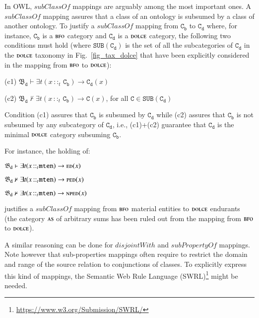 \documentclass[ao]{iosart2x}
\newcommand{\nb}[1]{\textcolor{red}{$|$}\marginpar{\hspace*{-0cm}\parbox{20mm}{\scriptsize\raggedright\textcolor{red}{#1}}}}
\newcommand{\bflist}{\begin{list}{}{\setlength{\topsep}{2mm}\setlength{\parsep}{0mm}\setlength{\leftmargin}{9.2mm}\setlength{\labelwidth}{8mm}}}
\newcommand{\eflist}{\end{list}}
\newcommand{\pr}[1]{\mathtt{#1}}
\newcommand{\cn}[1]{\mathtt{#1}}
\newcommand{\dolce}{{\textsc{dolce}}}
\newcommand{\bfo}{{\textsc{bfo}}}
\newcommand {\thbfobdmap} {\ensuremath{\mathfrak{B}_\texttt{d}}}
\newcommand {\ASdcat} {\textsc{as}}
\newcommand {\EDdcat} {\textsc{ed}}
\newcommand {\NPEDdcat} {\textsc{nped}}
\newcommand {\PEDdcat} {\textsc{ped}}
\newcommand{\mtenbcat}{\cn{mten}}
\newcommand{\bfoiof}[1]{{\,::_{#1\:\!}}}
\begin{document}
In OWL, $\mathit{subClassOf}$ mappings are arguably among the most important ones. A $\mathit{subClassOf}$ mapping assures that a class of an ontology is subsumed by a class of another ontology. To justify a $\mathit{subClassOf}$ mapping from $\pr{C_b}$ to $\pr{C_d}$ where, for instance, $\pr{C_b}$ is a $\bfo$ category and $\pr{C_d}$ is a $\dolce$ category, the following two conditions must hold (where $\pr{SUB}(\pr{C_d})$ is the set of all the subcategories of $\pr{C_d}$ in the $\dolce$ taxonomy in Fig.~\ref{fig_tax_dolce} that have been explicitly considered in the mapping from $\bfo$ to $\dolce$):
\bflist
\item[(c1)] $\thbfobdmap \vdash \exists t(x \bfoiof{t} \cn{C_b}) \to \pr{C_d}(x)$ 
\item[(c2)] $\thbfobdmap \nvdash \exists t(x \bfoiof{t}  \cn{C_b}) \to \pr{C}(x)$, for all $\pr{C} \in \pr{SUB}(\pr{C_d})$ 
\eflist
%
Condition (c1) assures that $\pr{C_b}$ is subsumed by $\pr{C_d}$ while (c2) assures that $\pr{C_b}$ is not subsumed by any subcategory of $\pr{C_d}$, i.e., (c1)+(c2) guarantee that $\pr{C_d}$ is the minimal $\dolce$ category subsuming $\pr{C_b}$.  

For instance, the holding of:
%
\bflist
\item[] $\thbfobdmap \vdash \exists t(x \bfoiof{t} \mtenbcat) \to \EDdcat(x)$ 
\item[] $\thbfobdmap \nvdash \exists t(x \bfoiof{t} \mtenbcat) \to \PEDdcat(x)$ 
\item[] $\thbfobdmap \nvdash \exists t(x \bfoiof{t} \mtenbcat) \to \NPEDdcat(x)$ 
\eflist
justifies a $\mathit{subClassOf}$ mapping from $\bfo$ material entities to $\dolce$ endurants (the category $\ASdcat$ of arbitrary sums has been ruled out from the mapping from $\bfo$ to $\dolce$). 

A similar reasoning can be done for $\mathit{disjointWith}$ and $\mathit{subPropertyOf}$ mappings. Note however that sub-properties mappings often require to restrict the domain and range of the source relation to conjunctions of classes.  To explicitly express this kind of mappings, the Semantic Web Rule Language (SWRL)\footnote{\url{https://www.w3.org/Submission/SWRL/}} %
might be needed.%
\end{document}
